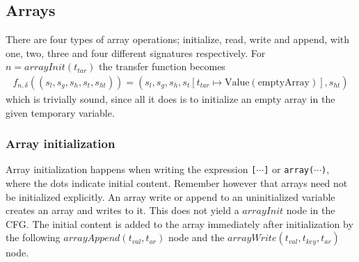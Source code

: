 \subsection{Arrays}

There are four types of array operations; initialize, read, write and append, with one, two, three and four different signatures respectively. For $n = \mathit{arrayInit}(t_{tar})$ the transfer function becomes
\begin{align}
f_{n,\delta}((s_l, s_g, s_h, s_t, s_{ht})) = (s_l, s_g, s_h, s_t[t_{tar}\mapsto \text{Value}(\text{emptyArray})], s_{ht})
\end{align}
which is trivially sound, since all it does is to initialize an empty array in the given temporary variable.

\subsubsection{Array initialization}
Array initialization happens when writing the expression \texttt{[$\cdots$]} or \texttt{array($\cdots$)}, where the dots indicate initial content. Remember however that arrays need not be initialized explicitly. An array write or append to an uninitialized variable creates an array and writes to it. This does not yield a $\mathit{arrayInit}$ node in the CFG. The initial content is added to the array immediately after initialization by the following $\mathit{arrayAppend}(t_{val}, t_{ar})$ node and  the $\mathit{arrayWrite}(t_{val}, t_{key}, t_{ar})$ node.

